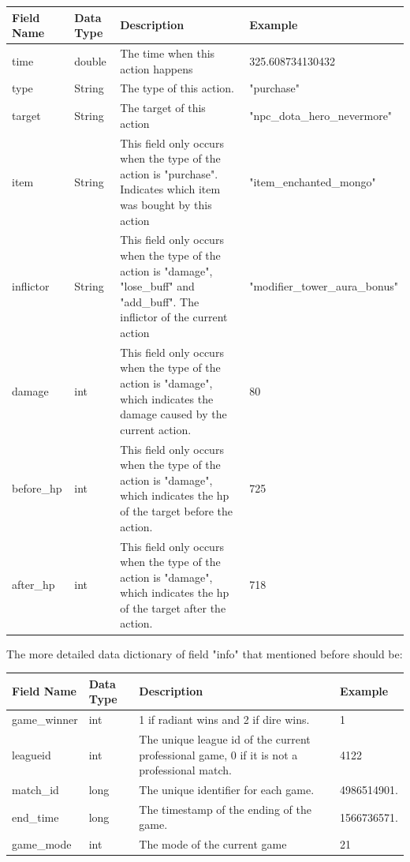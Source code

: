 \documentclass{article}
\begin{document}
\begin{tabular}{|p{3cm}|p{2cm}|p{5cm}|p{3cm}|}
\hline
Field Name& Data Type& Description & Example\\
\hline
time & double & The time when this action happens & 325.608734130432 \\
\hline
type & String & The type of this action. & "purchase" \\
\hline
target & String & The target of this action & "npc\_dota\_hero\_nevermore" \\
\hline
item & String & This field only occurs when the type of the action is "purchase". Indicates which item was bought by this action & "item\_enchanted\_mongo" \\
\hline
inflictor & String & This field only occurs when the type of the action is "damage", "lose\_buff" and "add\_buff". The inflictor of the current action & "modifier\_tower\_aura\_bonus" \\
\hline
damage & int & This field only occurs when the type of the action is "damage", which indicates the damage caused by the current action. & 80 \\
\hline
before\_hp & int &  This field only occurs when the type of the action is "damage", which indicates the hp of the target before the action. & 725 \\
\hline
after\_hp & int &  This field only occurs when the type of the action is "damage", which indicates the hp of the target after the action. & 718 \\
\hline
\end{tabular}

The more detailed data dictionary of field "info" that mentioned before should be: \\
\begin{tabular}{|p{3cm}|p{2cm}|p{5cm}|p{3cm}|}
\hline
Field Name& Data Type& Description & Example\\
\hline
game\_winner & int & 1 if radiant wins and 2 if dire wins. & 1 \\
\hline
leagueid & int & The unique league id of the current professional game, 0 if it is not a professional match. & 4122 \\
\hline
match\_id & long & The unique identifier for each game. & 4986514901. \\
\hline
end\_time & long & The timestamp of the ending of the game. & 1566736571. \\
\hline
game\_mode & int & The mode of the current game & 21 \\
\hline
\end{tabular}
\end{document}

